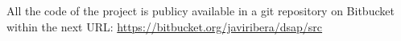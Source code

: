 All the code of the project is publicy available in a git repository on Bitbucket within the next URL: \url{https://bitbucket.org/javiribera/dsap/src}
